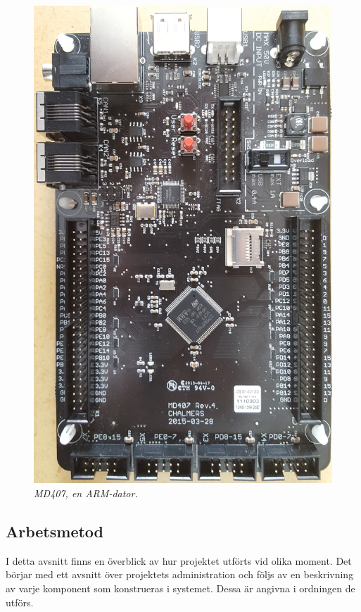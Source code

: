 \documentclass[a4paper]{article}
\begin{document}
\begin{figure}[H]
\includegraphics[scale=0.03]{MD407.jpg} \hspace{2mm}
\centering
\caption{\it MD407, en ARM-dator.}
\end{figure} 

\subsection{Arbetsmetod}
I detta avsnitt finns en överblick av hur projektet utförts vid olika moment. Det börjar med ett avsnitt över projektets administration och följs av en beskrivning av varje komponent som konstrueras i systemet. Dessa är angivna i ordningen de utförs.
\end{document}
